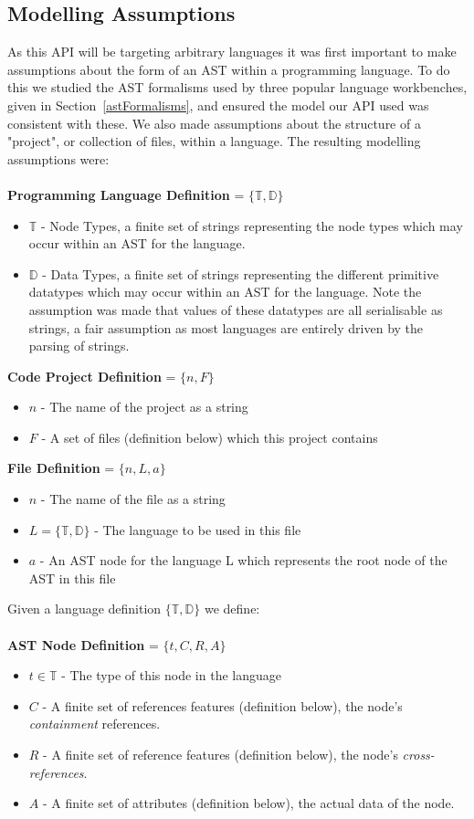 \documentclass{article}
\begin{document}
\subsection{Modelling Assumptions}\label{apiAssumptions}
As this API will be targeting arbitrary languages it was first important to make assumptions about the form of an AST within a programming language. To do this we studied the AST formalisms used by three popular language workbenches, given in Section~\ref{astFormalisms}, and ensured the model our API used was consistent with these. We also made assumptions about the structure of a "project", or collection of files, within a language. The resulting modelling assumptions were:
\\
\\
\textbf{Programming Language Definition} = $\{\mathbb{T},\mathbb{D}\}$ 
\begin{itemize}
\item $\mathbb{T}$ - Node Types, a finite set of strings representing the node types which may occur within an AST for the language.
\item $\mathbb{D}$ - Data Types, a finite set of strings representing the different primitive datatypes which may occur within an AST for the language. Note the assumption was made that values of these datatypes are all serialisable as strings, a fair assumption as most languages are entirely driven by the parsing of strings.
\end{itemize}
%
\textbf{Code Project Definition} = $\{n,F \}$ 
\begin{itemize}
\item $n$ - The name of the project as a string
\item $F$ - A set of files (definition below) which this project contains
\end{itemize}
%
\textbf{File Definition} = $\{n, L, a\}$ 
\begin{itemize}
\item $n$ - The name of the file as a string
\item $L=\{\mathbb{T},\mathbb{D}\}$ - The language to be used in this file
\item $a$ - An AST node for the language L which represents the root node of the AST in this file
\end{itemize}
%
Given a language definition $\{\mathbb{T},\mathbb{D}\}$ we define:\\
\\
\textbf{AST Node Definition} = $\{t,C,R,A\}$ 
\begin{itemize}
\item $t\in \mathbb{T}$ - The type of this node in the language
\item $C$ - A finite set of references features (definition below), the node's \emph{containment} references.
\item $R$ - A finite set of reference features (definition below), the node's \emph{cross-references}.
\item $A$ - A finite set of attributes (definition below), the actual data of the node.
\end{itemize}
\end{document}

